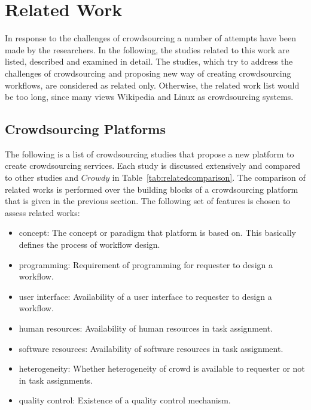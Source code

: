 \chapter{Related Work}
\label{chap:relatedwork}

In response to the challenges of crowdsourcing a number of attempts have been made 
by the researchers. In the following, the studies related to this work are listed, 
described and examined in detail. The studies, which try to address the challenges of 
crowdsourcing and proposing new way of creating crowdsourcing workflows, are
considered as related only. Otherwise, the related work list would be too long, 
since many views Wikipedia and Linux as crowdsourcing systems.


\section{Crowdsourcing Platforms}
The following is a list of crowdsourcing studies that propose a new platform 
to create crowdsourcing services. Each study is discussed extensively 
and compared to other studies and $Crowdy$ in Table~\ref{tab:relatedcomparison}. 
The comparison of related works is performed over the building blocks of 
a crowdsourcing platform that is given in the previous section. The following 
set of features is chosen to assess related works:
\begin{itemize}
	\item concept: The concept or paradigm that platform is based on. This 
	basically defines the process of workflow design.
	\item programming: Requirement of programming for requester to design a workflow.
	\item user interface: Availability of a user interface to requester to design a workflow. 
	\item human resources: Availability of human resources in task assignment.
	\item software resources: Availability of software resources in task assignment.
	\item heterogeneity: Whether heterogeneity of crowd is available to requester or not
	in task assignments.
	\item quality control: Existence of a quality control mechanism.
\end{itemize}

